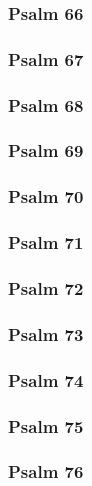 \documentclass[12pt]{extarticle}
\begin{document}
\begin{multicols}{2}
\subsubsection{Psalm 66}

\newpage

\subsubsection{Psalm 67}

\newpage

\subsubsection{Psalm 68}

\newpage

\subsubsection{Psalm 69}

\newpage

\subsubsection{Psalm 70}

\newpage

\subsubsection{Psalm 71}

\newpage

\subsubsection{Psalm 72}

\newpage

\subsubsection{Psalm 73}

\newpage

\subsubsection{Psalm 74}

\newpage

\subsubsection{Psalm 75}

\newpage

\subsubsection{Psalm 76}

\newpage


\end{multicols}
\end{document}
